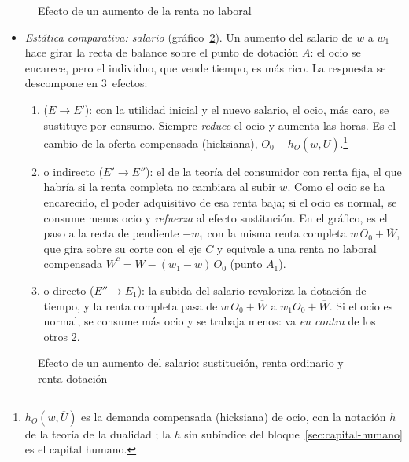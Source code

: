 \documentclass[11pt]{article}
\begin{document}
\begin{figure}[H]
\centering
\caption{Efecto de un aumento de la renta no laboral}\label{fig:renta-no-laboral}
\end{figure}

\begin{itemize}
\item \emph{Estática comparativa: salario} (gráfico~\ref{fig:efectos-salario}). Un aumento del salario de $w$ a $w_1$ hace girar la recta de balance sobre el punto de dotación $A$: el ocio se encarece, pero el individuo, que vende tiempo, es más rico. La respuesta se descompone en 3~efectos:
  \begin{enumerate}
  \item {} ($E\to E'$): con la utilidad inicial y el nuevo salario, el ocio, más caro, se sustituye por consumo. Siempre \emph{reduce} el ocio y aumenta las horas. Es el cambio de la oferta compensada (hicksiana), $O_0-h_O(w,\overline{U})$.\footnote{$h_O(w,\overline{U})$ es la demanda compensada (hicksiana) de ocio, con la notación $h$ de la teoría de la dualidad ; la $h$ sin subíndice del bloque~\ref{sec:capital-humano} es el capital humano.}
  \item {} o indirecto ($E'\to E''$): el de la teoría del consumidor con renta fija, el que habría si la renta completa no cambiara al subir $w$. Como el ocio se ha encarecido, el poder adquisitivo de esa renta baja; si el ocio es normal, se consume menos ocio y \emph{refuerza} al efecto sustitución. En el gráfico, es el paso a la recta de pendiente $-w_1$ con la misma renta completa $w\,O_0+\overline{W}$, que gira sobre su corte con el eje $C$ y equivale a una renta no laboral compensada $\overline{W}^c=\overline{W}-(w_1-w)\,O_0$ (punto $A_1$).
  \item {} o directo ($E''\to E_1$): la subida del salario revaloriza la dotación de tiempo, y la renta completa pasa de $w\,O_0+\overline{W}$ a $w_1O_0+\overline{W}$. Si el ocio es normal, se consume más ocio y se trabaja menos: va \emph{en contra} de los otros 2.
  \end{enumerate}
\end{itemize}

\begin{figure}[H]
\centering
\caption{Efecto de un aumento del salario: sustitución, renta ordinario y renta dotación}\label{fig:efectos-salario}
\end{figure}
\end{document}
